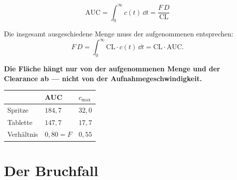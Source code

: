 \begin{merksatz}
\[ \mathrm{AUC} = \int_0^\infty c(t)\,\dd t = \frac{F\,D}{\mathrm{CL}} \]

Die insgesamt ausgeschiedene Menge muss der aufgenommenen entsprechen:
\[ F\,D = \int_0^\infty \mathrm{CL}\cdot c(t)\,\dd t = \mathrm{CL}\cdot\mathrm{AUC} . \]

\begin{center}
\begin{minipage}{0.9\textwidth}
\textbf{Die Fläche hängt nur von der aufgenommenen Menge und der Clearance ab --- nicht von der Aufnahmegeschwindigkeit.}
\end{minipage}
\end{center}

\begin{center}
\renewcommand{\arraystretch}{1.48}
\begin{tabular}{@{}P{2.4cm}P{2.6cm}P{2.4cm}@{}}
\toprule
& \textbf{AUC} & $c_{\max}$\\
\midrule
Spritze & $184{,}7$ & $32{,}0$\\
Tablette & $147{,}7$ & $17{,}7$\\
Verhältnis & $0{,}80 = F$ & $0{,}55$\\
\bottomrule
\end{tabular}
\end{center}

\begin{center}
\begin{minipage}{0.88\textwidth}
\end{minipage}
\end{center}
\end{merksatz}

\section{Der Bruchfall}

